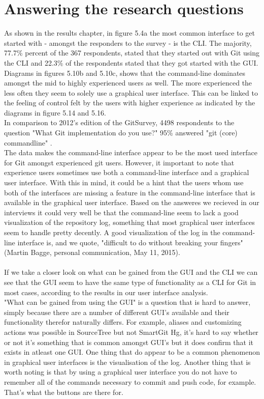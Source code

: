 \documentclass[a4paper,oneside]{bth} %
\begin{document}
			\section{Answering the research questions}
				As shown in the results chapter, in figure 5.4a the most common interface to get started with - amongst the responders to the survey - is the CLI.
				The majority, 77.7\% percent of the 367 respondents, stated that they started out with Git using the CLI and 22.3\% of the respondents stated that they got started with the GUI.\\
				Diagrams in figures 5.10b and 5.10c, shows that the command-line dominates amongst the mid to highly experienced users as well. The more experienced the less often they seem to solely use a graphical user interface. This can be linked to the feeling of control felt by the users with higher experience as indicated by the diagrams in figure 5.14 and 5.16.\\
				In comparison to 2012's edition of the GitSurvey, 4498 respondents to the question "What Git implementation do you use?" 95\% answered "git (core) commandline" \cite{GitStructure}.\\	
				The data makes the command-line interface appear to be the most used interface for Git amongst experienced git users.
				However, it important to note that experience users sometimes use both a command-line interface and a graphical user interface.
				With this in mind, it could be a hint that the users whom use both of the interfaces are missing a feature in the command-line interface that is available in the graphical user interface.
				Based on the answeres we recieved in our interviews it could very well be that the command-line seem to lack a good visualization of the repository log, something that most graphical user interfaces seem to handle pretty decently.
				A good visualization of the log in the command-line interface is, and we quote, "difficult to do without breaking your fingers" (Martin Bagge, personal communication, May 11, 2015). %
				\\\\
				If we take a closer look on what can be gained from the GUI and the CLI we can see that the GUI seem to have the same type of functionality as a CLI for Git in most cases, according to the results in our user interface analysis.\\
				"What can be gained from using the GUI" is a question that is hard to answer, simply because there are a number of different GUI's available and their functionality therefor naturally differs.
				For example, aliases and customizing actions was possible in SourceTree but not SmartGit Hg, it's hard to say whether or not it's something that is common amongst GUI's but it does confirm that it exists in atleast one GUI.
				One thing that do appear to be a common phenomenon in graphical user interfaces is the visualisation of the log.
				Another thing that is worth noting is that by using a graphical user interface you do not have to remember all of the commands necessary to commit and push code, for example.
				That's what the buttons are there for.
				
\end{document}

